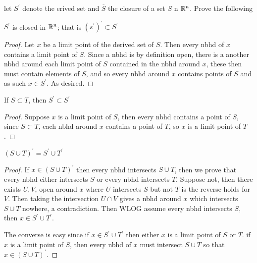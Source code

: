     \question
    let $S^\prime$ denote the erived set and $\overline{S}$ the closure of a set $S$ n $\mathbb{R}^n$. Prove the 
    following 

    \begin{alphaparts}
        \questionpart 
        $S^\prime$ is closed in $\mathbb{R}^n$; that is $(s^\prime)^\prime \subset S^\prime$ 

        \begin{proof}
            Let $x$ be a limit point of the derived set of $S$. Then every nbhd of $x$ contains a limit 
            point of $S$. Since a nbhd is by definition open, there is a another nbhd around each limit point 
            of $S$ contained in the nbhd around $x$, these then must contain elements of $S$, and so every nbhd around $x$ 
            contains points of $S$ and as such $x \in S^\prime$. As desired. 
        \end{proof}

        \questionpart 
        If $S \subset T$, then $S^\prime \subset S^\prime$ 

        \begin{proof}
            Suppose $x$ is a limit point of $S$, then every nbhd contains a point of $S$, 
            since $S \subset T$, each nbhd around $x$ contains a point of $T$, so $x$ is a limit point of $T$. 

        \end{proof}

        \questionpart 
        $(S \cup T)^\prime = S^\prime \cup T^\prime$

        \begin{proof}
            If $x \in (S \cup T)^\prime$ then every nbhd intersects $S \cup T$, 
            then we prove that every nbhd either intersects $S$ or every nbhd intersects $T$. Suppose 
            not, then there exists $U, V$, open around $x$ where $U$ intersects $S$ but not $T$ is the reverse holds for $V$. 
            Then taking the intersection $U \cap V$ gives a nbhd around $x$ which intersects $S \cup T$ nowhere, a contradiction. 
            Then WLOG assume every nbhd intersects $S$, then $x \in S^\prime \cup T^\prime$. 

            The converse is easy since if $x \in S^\prime \cup T^\prime$ then either $x$ is a limit point of $S$ or $T$. 
            if $x$ is a limit point of $S$, then every nbhd of $x$ must intersect $S \cup T$ so that $x \in (S \cup T)^\prime$. 

        \end{proof}


\end{alphaparts}
